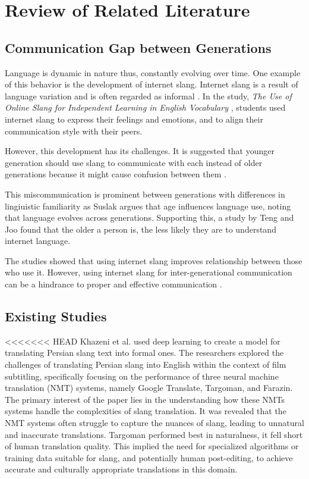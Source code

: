 \chapter{Review of Related Literature}
\label{sec:relatedlit}

\section{Communication Gap between Generations}
Language is dynamic in nature thus, constantly evolving over time. One example of this behavior is the development of internet slang. Internet slang is a result of language variation and is often regarded as informal \cite{Liu_Gui_Zuo_Dai_2019}. In the study, \textit{The Use of Online Slang for Independent Learning in English Vocabulary} \cite{Ambarsari_Amrullah_Nawawi_2020}, students used internet slang to express their feelings and emotions, and to align their communication style with their peers. 

However, this development has its challenges. It is suggested that younger generation should use slang to communicate with each instead of older generations because it might cause confusion between them \cite{Jeresano_Carretero_2022}.

This miscommunication is prominent between generations with differences in lingiuistic familiarity as Suslak \cite{SUSLAK2009199} argues that age influences language use, noting that language evolves across generations.
Supporting this, a study by Teng and Joo \cite{Teng_Joo2023} found that the older a person is, the less likely they are to understand internet language.

The studies showed that using internet slang improves relationship between those who use it. However, using internet slang for inter-generational communication can be a hindrance to proper and effective communication \cite{gonzagaforda}.


\section{Existing Studies}
<<<<<<< HEAD
Khazeni et al. \cite{Khazeni} used deep learning to create a model for translating Persian slang text into formal ones. The researchers explored the challenges of translating Persian slang into English within the context of film subtitling, specifically focusing on the performance of three neural machine translation (NMT) systems, namely Google Translate, Targoman, and Farazin. The primary interest of the paper lies in the understanding how these NMTs systems handle  the complexities of slang translation. It was revealed that the NMT systems often struggle to capture the nuances of slang, leading to unnatural and inaccurate translations. Targoman performed best in naturalness, it fell short of human translation quality. This implied the need for specialized algorithms or training data suitable for slang, and potentially human post-editing, to achieve accurate and culturally appropriate translations in this domain.
 
